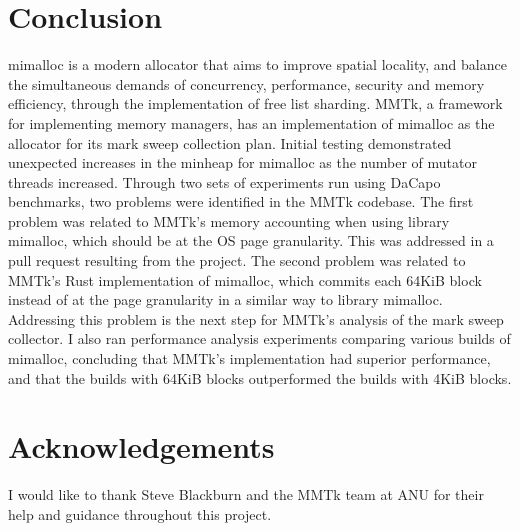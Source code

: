 \documentclass{article}
\begin{document}
\section{Conclusion}
mimalloc is a modern allocator that aims to improve spatial locality, and balance the simultaneous demands of concurrency, performance, security and memory efficiency, through the implementation of free list sharding. MMTk, a framework for implementing memory managers, has an implementation of mimalloc as the allocator for its mark sweep collection plan. Initial testing demonstrated unexpected increases in the minheap for mimalloc as the number of mutator threads increased. Through two sets of experiments run using DaCapo benchmarks, two problems were identified in the MMTk codebase. The first problem was related to MMTk's memory accounting when using library mimalloc, which should be at the OS page granularity. This was addressed in a pull request resulting from the project. The second problem was related to MMTk's Rust implementation of mimalloc, which commits each 64KiB block instead of at the page granularity in a similar way to library mimalloc. Addressing this problem is the next step for MMTk's analysis of the mark sweep collector. I also ran performance analysis experiments comparing various builds of mimalloc, concluding that MMTk's implementation had superior performance, and that the builds with 64KiB blocks outperformed the builds with 4KiB blocks.

\section*{Acknowledgements}
I would like to thank Steve Blackburn and the MMTk team at ANU for their help and guidance throughout this project.



\end{document}

